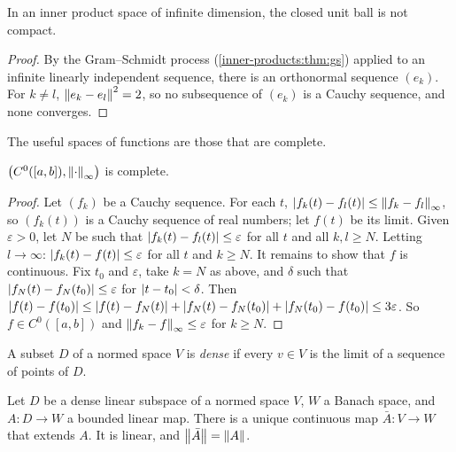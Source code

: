 \begin{notechapter}
\begin{proposition}
\label{norms-banach:prop:not-compact}
In an inner product space of infinite dimension, the closed unit ball is
not compact.
\end{proposition}

\begin{proof}
By the Gram--Schmidt process (\cref{inner-products:thm:gs}) applied to an
infinite linearly independent sequence, there is an orthonormal sequence
$(e_k)$. For $k\neq l$, $\left\|e_k - e_l\right\|^2 = 2$, so no subsequence of
$(e_k)$ is a Cauchy sequence, and none converges.
\end{proof}

The useful spaces of functions are those that are complete.

\begin{theorem}
\label{norms-banach:thm:c0}
$\bigl(C^0([a, b]), \left\|\cdot\right\|_\infty\bigr)$ is complete.
\end{theorem}

\begin{proof}
Let $(f_k)$ be a Cauchy sequence. For each $t$,
$\left|f_k(t) - f_l(t)\right|\leq\left\|f_k - f_l\right\|_\infty$, so $(f_k(t))$ is a
Cauchy sequence of real numbers; let $f(t)$ be its limit. Given
$\varepsilon > 0$, let $N$ be such that
$\left|f_k(t) - f_l(t)\right|\leq\varepsilon$ for all $t$ and all $k, l\geq N$.
Letting $l\to\infty$: $\left|f_k(t) - f(t)\right|\leq\varepsilon$ for all $t$ and
$k\geq N$. It remains to show that $f$ is continuous. Fix $t_0$ and
$\varepsilon$, take $k = N$ as above, and $\delta$ such that
$\left|f_N(t) - f_N(t_0)\right|\leq\varepsilon$ for $\left|t - t_0\right| < \delta$. Then
$\left|f(t) - f(t_0)\right|\leq\left|f(t) - f_N(t)\right| + \left|f_N(t) - f_N(t_0)\right|
+ \left|f_N(t_0) - f(t_0)\right|\leq3\varepsilon$. So $f\in C^0([a, b])$ and
$\left\|f_k - f\right\|_\infty\leq\varepsilon$ for $k\geq N$.
\end{proof}

\begin{definition}
A subset $D$ of a normed space $V$ is \emph{dense} if every $v\in V$ is the
limit of a sequence of points of $D$.
\end{definition}

\begin{theorem}
\label{norms-banach:thm:blt}
Let $D$ be a dense linear subspace of a normed space $V$, $W$ a Banach
space, and $A:D\to W$ a bounded linear map. There is a unique continuous
map $\bar A:V\to W$ that extends $A$. It is linear, and
$\left\|\bar A\right\| = \left\|A\right\|$.
\end{theorem}


\end{notechapter}
